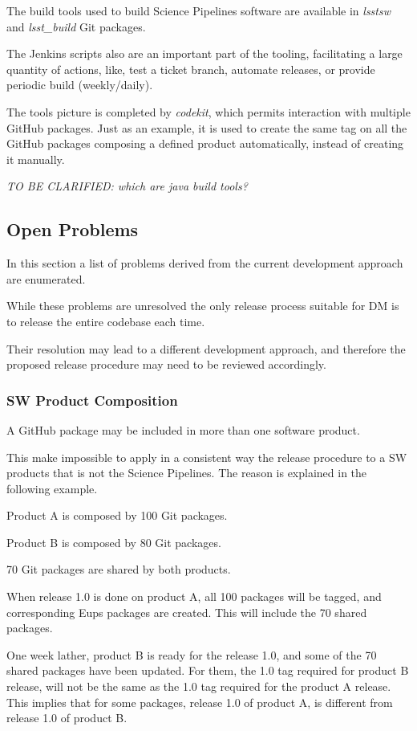The build tools used to build Science Pipelines software are available in \textit{lsstsw} and \textit{lsst\_build} Git packages.

The Jenkins scripts also are an important part of the tooling, facilitating a large quantity of actions, like, test a ticket branch, automate releases, or provide periodic build (weekly/daily).

The tools picture is completed by \textit{codekit}, which permits interaction with multiple GitHub packages.
Just as an example, it is used to create the same tag on all the GitHub packages composing a defined product automatically, instead of creating it manually.

\textit{TO BE CLARIFIED: which are java build tools?}


\subsection{Open Problems} \label{sec:openProblems}

In this section a list of problems derived from the current development approach are enumerated. 

While these problems are unresolved the only release process suitable for DM is to release the entire codebase each time.

Their resolution may lead to a different development approach, and therefore the proposed release procedure may need to be reviewed accordingly.


\subsubsection{SW Product Composition} \label{sec:problemId}

A GitHub package may be included in more than one software product.

This make impossible to apply in a consistent way the release procedure to a SW products that is not the Science Pipelines.
The reason is explained in the following example.

Product A is composed by 100 Git packages.

Product B is composed by 80 Git packages.

70 Git packages are shared by both products.

When release 1.0 is done on product A, all 100 packages will be tagged, and corresponding Eups packages are created. This will include the 70 shared packages.

One week lather, product B is ready for the release 1.0, and some of the 70 shared packages have been updated.
For them, the 1.0 tag required for product B release, will not be the same as the 1.0 tag required for the product A release.
This implies that for some packages, release 1.0 of product A, is different from release 1.0 of product B.

